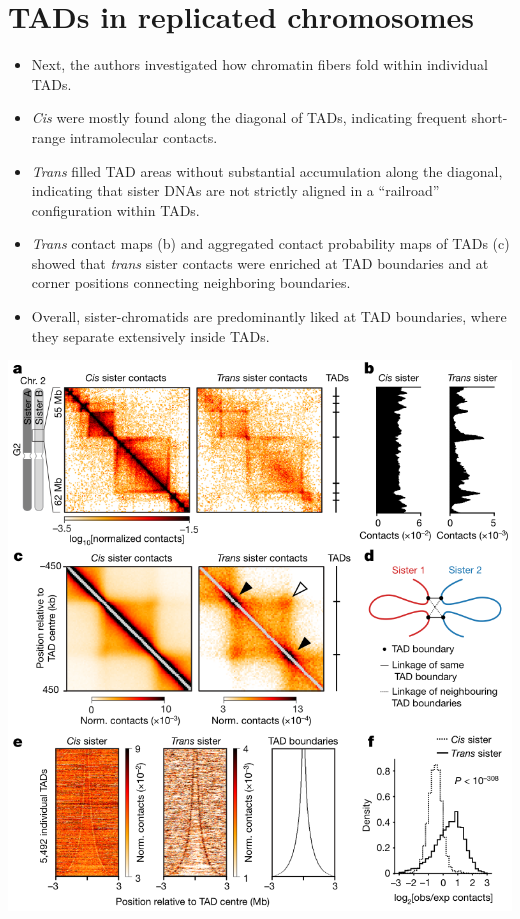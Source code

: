 \documentclass[plain,basic]{inVerba-notes}
\begin{document}
\section{TADs in replicated chromosomes}
\begin{itemize}
    \item Next, the authors investigated how chromatin fibers fold within individual TADs.
    \item \textit{Cis} were mostly found along the diagonal of TADs, indicating frequent short-range intramolecular contacts.
    \item \textit{Trans} filled TAD areas without substantial accumulation along the diagonal, indicating that sister DNAs are not strictly aligned in a ``railroad'' configuration within TADs.
    \item \textit{Trans} contact maps (b) and aggregated contact probability maps of TADs (c) showed that \textit{trans} sister contacts were enriched at TAD boundaries and at corner positions connecting neighboring boundaries.
    \item Overall, sister-chromatids are predominantly liked at TAD boundaries, where they separate extensively inside TADs.
\end{itemize}
\begin{center}
    \includegraphics[scale=0.5]{images/8-3.png}
\end{center}
\end{document}
